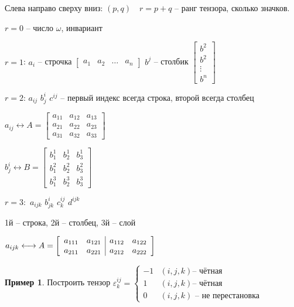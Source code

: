 \documentclass{book}
\theoremstyle{definition}
\newtheorem*{example}{Пример}
\begin{document}
        \begin{definition}

            Слева направо сверху вниз: $(p,q)\quad r = p+q$ -- ранг тензора, сколько значков.

             $r = 0$ -- число  $\omega$, инвариант
            
             $r = 1$:  $a_i$ -- строчка $\begin{bmatrix} a_1&a_2&\ldots&a_n \end{bmatrix} $ $ b^j$ -- столбик  $\begin{bmatrix} b^2\\b^2\\ \vdots\\ b^n \end{bmatrix} $ 

             $r = 2$: $a_{ij}$  $b_{j}^i$ $c^{ij}$ -- первый индекс всегда строка, второй всегда столбец

             $a_{ij} \longleftrightarrow A = \begin{bmatrix} a_{11} & a_{12} & a_{13}\\ a_{21} & a_{22} & a_{23}\\ a_{31} & a_{32} & a_{33} \end{bmatrix} $ 

             $b^i_j \longleftrightarrow B = \begin{bmatrix} b_1^1 & b_2^1&b_3^1\\b_1^2 & b_2^2 & b_3^2\\ b_1^3 & b_2^3 & b_3^3 \end{bmatrix} $ 

             $r = 3:$  $a_{i j k}$  $b^i_{jk}$  $c^{ij}_k$ $d^{ijk}$

             1й -- строка, 2й -- столбец, 3й -- слой

             $a_{ijk} \longleftrightarrow A = \left[\begin{array}{c c | c c} a_{111} & a_{121} & a_{112} & a_{122}\\ a_{211} & a_{221} & a_{212} & a_{222}\end{array}\right] $ 

             \begin{example}
                 Построить тензор $\varepsilon_k^{ij} = \begin{cases}
                     -1 & (i,j,k) \text{-- чётная}\\
                     1 & (i,j,k) \text{-- чётная}\\
                 0 & (i,j,k)\text{ -- не перестановка}
                 \end{cases}$
             \end{example}


\end{definition}
\end{document}
